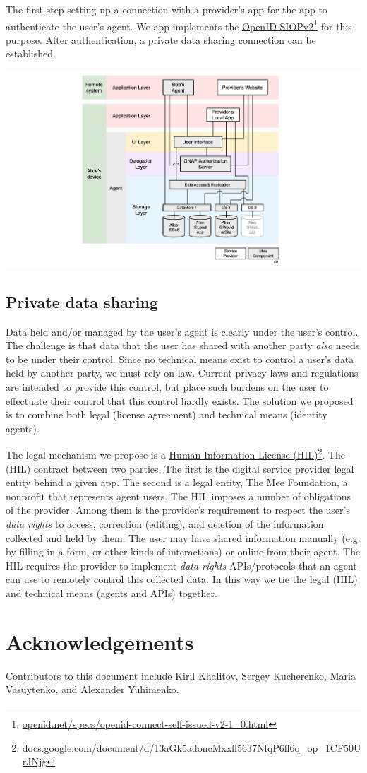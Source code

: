 \documentclass[11pt, oneside]{article}   	%
\newcommand{\hyperfootnote}[1][]{\def\ArgI{{#1}}\hyperfootnoteRelay}
\newcommand\hyperfootnoteRelay[2][]{\href{#1#2}{\ArgI}\footnote{\href{#1#2}{#2}}}
\begin{document}
The first step setting up a connection with a provider's app for the app to authenticate the user's agent. We app implements the \hyperfootnote[OpenID SIOPv2][https://]{openid.net/specs/openid-connect-self-issued-v2-1\_0.html} for this purpose. After authentication, a private data sharing connection can be established.

\includegraphics[width=\textwidth]{./images/applications.png}

\subsection{Private data sharing}

Data held and/or managed by the user's agent is clearly under the user's control. The challenge is that data that the user has shared with another party \emph{also} needs to be under their control. Since no technical means exist to control a user's data held by another party, we must rely on law. Current privacy laws and regulations are intended to provide this control, but place such burdens on the user to effectuate their control that this control hardly exists. The solution we proposed is to combine both legal (license agreement) and technical means (identity agents). 

The legal mechanism we propose is a \hyperfootnote[Human Information License (HIL)][https://]{docs.google.com/document/d/13aGk5adoncMxxfl5637NfqP6fl6q\_op\_1CF50UrJNjg}. The (HIL) contract between two parties. The first is the digital service provider legal entity behind a given app. The second is a legal entity, The Mee Foundation, a nonprofit that represents agent users. The HIL imposes a number of obligations of the provider. Among them is the provider's requirement to respect the user's \emph{data rights} to access, correction (editing), and deletion of the information collected and held by them. The user may have shared information manually (e.g. by filling in a form, or other kinds of interactions) or online from their agent. The HIL requires the provider to implement \emph{data rights} APIs/protocols that an agent can use to remotely control this collected data. In this way we tie the legal (HIL) and technical means (agents and APIs) together.


\section{Acknowledgements}
Contributors to this document include Kiril Khalitov, Sergey Kucherenko, Maria Vasuytenko, and Alexander Yuhimenko.



\end{document}
